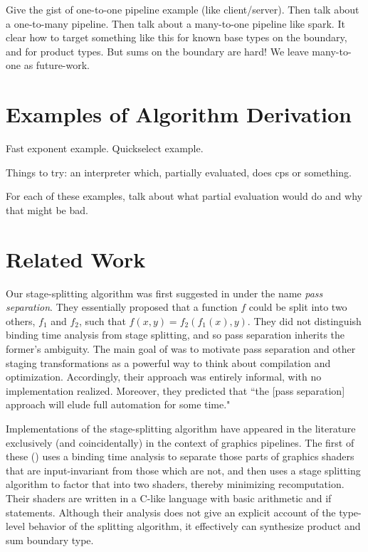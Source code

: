 \documentclass{sigplanconf}
\begin{document}
Give the gist of one-to-one pipeline example (like client/server).
Then talk about a one-to-many pipeline.
Then talk about a many-to-one pipeline like spark.  It clear how to target something like this for known base types on the boundary, and for product types.  But sums on the boundary are hard!  We leave many-to-one as future-work.


\section{Examples of Algorithm Derivation}

Fast exponent example.  Quickselect example.

Things to try: an interpreter which, partially evaluated, does cps or something.

For each of these examples, talk about what partial evaluation would do and why that might be bad.

\section{Related Work}

Our stage-splitting algorithm was first suggested in \cite{jorring86} under the name {\em pass separation}.  They essentially proposed that a function $f$ could be split into two others, $f_1$ and $f_2$, such that $f(x,y)=f_2(f_1(x),y)$.  They did not distinguish binding time analysis from stage splitting, and so pass separation inherits the former's ambiguity.  The main goal of \cite{jorring86} was to motivate pass separation and other staging transformations as a powerful way to think about compilation and optimization.  Accordingly, their approach was entirely informal, with no implementation realized.  Moreover, they predicted that ``the [pass separation] approach will elude full automation for some time."  

Implementations of the stage-splitting algorithm have appeared in the literature exclusively (and coincidentally) in the context of graphics pipelines.  The first of these (\cite{knoblock96}) uses a binding time analysis to separate those parts of graphics shaders that are input-invariant from those which are not, and then uses a stage splitting algorithm to factor that into two shaders, thereby minimizing recomputation.  Their shaders are written in a C-like language with basic arithmetic and if statements.  Although their analysis does not give an explicit account of the type-level behavior of the splitting algorithm, it effectively can synthesize product and sum boundary type.  
\end{document}
